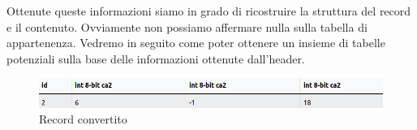 \newpage

Ottenute queste informazioni siamo in grado di ricostruire la struttura del record e il contenuto. Ovviamente non possiamo affermare nulla sulla tabella di appartenenza. Vedremo in seguito come poter ottenere un insieme di tabelle potenziali sulla base delle informazioni ottenute dall'header.

\medskip

\begin{figure}[ht]
	\centering
	\includegraphics[scale=0.45, ]{assets/record_parse}
	\caption{Record convertito}
	\label{fig:recordparse}
\end{figure}


